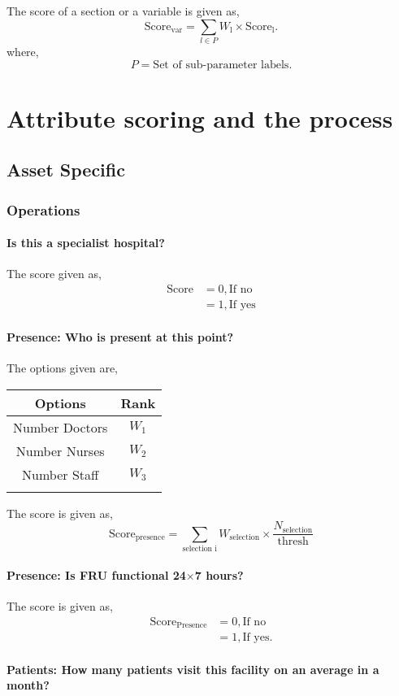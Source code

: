 \documentclass[oneside]{article}
\newcommand{\tsub}[2]{\text{#1}_{\text{#2}}}
\newcommand{\tsubb}[2]{#1_{\text{#2}}}
\newenvironment{ttable}
{
\begin{center}
\begin{tabular}{c|c}
\hline
}
{
\\ \hline
\end{tabular}
\end{center}
}
\begin{document}
The score of a section or a variable is given as,
\[
	\tsub{Score}{var} = \sum_{l \in P} \tsubb{W}{l} \times \tsub{Score}{l}.
\]
where,
\[
	P = \text{Set of sub-parameter labels.}
\]
\section{Attribute scoring and the
process}
\subsection{Asset Specific}
\subsubsection{Operations}

\paragraph{ Is this a specialist hospital?}
The score given as,
\begin{align*}
	\tsub{Score}{} &= 0, \text{If no} \\
	&= 1, \text{If yes}
\end{align*}
\paragraph{Presence: Who is present at this point?}

The options given are,
\begin{ttable}
Options & Rank \\ \hline
Number Doctors & $W_1$ \\
Number Nurses & $W_2$ \\
	Number Staff & $W_3$ \\
\hline
\end{ttable}
The score is given as,
\[
	\tsub{Score}{presence} = \sum_{\text{selection i}} \tsubb{W}{selection} \times \dfrac{\tsubb{N}{selection}}{\text{thresh}}
\]
\paragraph{Presence: Is FRU functional 24$\times$7 hours?}

The score is given as,
\begin{align*}
\tsub{Score}{Presence} &= 0, \text{If no} \\
        &= 1, \text{If yes}.
\end{align*}
\paragraph{Patients: How many patients visit this facility on an average in a month?}
\end{document}
